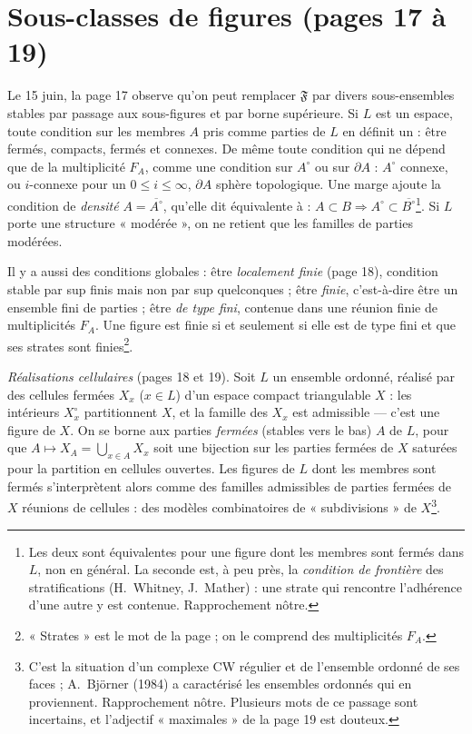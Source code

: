 \documentclass[11pt,a4paper]{article}
\begin{document}
\section*{Sous-classes de figures (pages 17 à 19)}

Le 15 juin, la page 17 observe qu'on peut remplacer $\mathfrak{F}$ par divers
sous-ensembles stables par passage aux sous-figures et par borne supérieure.
Si $L$ est un espace, toute condition sur les membres $A$ pris comme parties de
$L$ en définit un : être fermés, compacts, fermés et connexes. De même toute
condition qui ne dépend que de la multiplicité $F_{A}$, comme une condition sur
$A^{\circ}$ ou sur $\partial A$ : $A^{\circ}$ connexe, ou $i$-connexe pour un
$0 \leq i \leq \infty$, $\partial A$ sphère topologique. Une marge ajoute la
condition de \emph{densité} $A = \overline{A^{\circ}}$, qu'elle dit équivalente
à : $A \subset B \Rightarrow A^{\circ} \subset \overline{B^{\circ}}$\footnote{Les
deux sont équivalentes pour une figure dont les membres sont fermés dans $L$,
non en général. La seconde est, à peu près, la \emph{condition de frontière}
des stratifications (H.~Whitney, J.~Mather) : une strate qui rencontre
l'adhérence d'une autre y est contenue. Rapprochement nôtre.}. Si $L$ porte une
structure « modérée », on ne retient que les familles de parties modérées.

Il y a aussi des conditions globales : être \emph{localement finie} (page 18),
condition stable par sup finis mais non par sup quelconques ; être
\emph{finie}, c'est-à-dire être un ensemble fini de parties ; être \emph{de type
fini}, contenue dans une réunion finie de multiplicités $F_{A}$. Une figure est
finie si et seulement si elle est de type fini et que ses strates sont
finies\footnote{« Strates » est le mot de la page ; on le comprend des
multiplicités $F_{A}$.}.

\emph{Réalisations cellulaires} (pages 18 et 19). Soit $L$ un ensemble ordonné,
réalisé par des cellules fermées $X_{x}$ ($x \in L$) d'un espace compact
triangulable $X$ : les intérieurs $X_{x}^{\circ}$ partitionnent $X$, et la
famille des $X_{x}$ est admissible --- c'est une figure de $X$. On se borne aux
parties \emph{fermées} (stables vers le bas) $A$ de $L$, pour que $A \mapsto
X_{A} = \bigcup_{x \in A} X_{x}$ soit une bijection sur les parties fermées de
$X$ saturées pour la partition en cellules ouvertes. Les figures de $L$ dont
les membres sont fermés s'interprètent alors comme des familles admissibles de
parties fermées de $X$ réunions de cellules : des modèles combinatoires de
« subdivisions » de $X$\footnote{C'est la situation d'un complexe CW régulier et
de l'ensemble ordonné de ses faces ; A.~Björner (1984) a caractérisé les
ensembles ordonnés qui en proviennent. Rapprochement nôtre. Plusieurs mots de ce
passage sont incertains, et l'adjectif « maximales » de la page 19 est
douteux.}.
\end{document}
